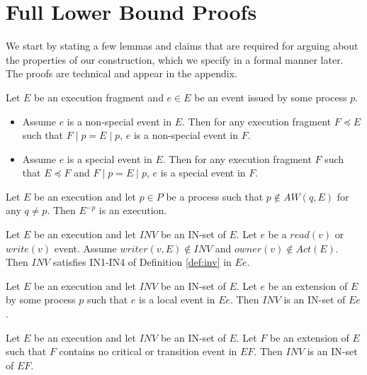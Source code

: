 \section{Full Lower Bound Proofs}
\label{sec:FullProof}

We start by stating a few lemmas and claims that are required for arguing about the properties of our construction, which we specify in a formal manner later. The proofs are technical and appear in the appendix.

\begin{claim-num}  \label{claim: maintain-criticalness}
	Let $E$ be an execution fragment and $e \in E$ be an event issued by some process $p$.
	\begin{itemize}
		\item Assume $e$ is a non-special event in $E$. Then for any execution fragment $F \preceq E$ such that $F \mid p = E \mid p$, $e$ is a non-special event in $F$.
		\item Assume $e$ is a special event in $E$. Then for any execution fragment $F$ such that $E \preceq F$ and $F \mid p = E \mid p$, $e$ is a special event in $F$.
	\end{itemize}
\end{claim-num}

\begin{lemma} \label{lem: sub-execution}
	Let $E$ be an execution and let $p \in P$ be a process such that $p \notin AW(q,E)$ for any $q \neq p$. Then $E^{-p}$ is an execution.
\end{lemma}

\begin{lemma}  \label{lem: access-visible-variable}
	Let $E$ be an execution and let $\mathit{INV}$ be an IN-set of $E$. Let $e$ be a $read(v)$ or $write(v)$ event. Assume $writer(v,E) \notin \mathit{INV}$ and $owner(v) \notin Act(E)$. Then $\mathit{INV}$ satisfies IN1-IN4 of Definition \ref{def:inv} in $E e$.
\end{lemma}

\begin{claim} \label{claim: local-event-extension}
	Let $E$ be an execution and let $\mathit{INV}$ be an IN-set of $E$. Let $e$ be an extension of $E$ by some process $p$ such that $e$ is a local event in $E e$. Then $\mathit{INV}$ is an IN-set of $E e$.
\end{claim}

\begin{lemma} \label{lem: non-critical-extension}
	Let $E$ be an execution and let $\mathit{INV}$ be an IN-set of $E$. Let $F$ be an extension of $E$ such that $F$ contains no critical or transition event in $E F$. Then $\mathit{INV}$ is an IN-set of $E F$.
\end{lemma}

